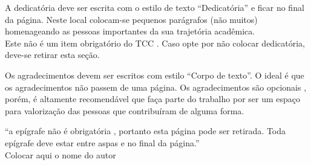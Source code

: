 \documentclass[
        oneside,      %
        english,			
        brazil			 
        ]{configcefetmglpd}
\begin{document}


\printacapa

\printafolhaderosto

\printacatalog  


\printafolhaaprov


 \begin{dedicatoria}
  		A dedicatória deve ser escrita com o estilo de texto “Dedicatória” e ficar no final da página. Neste local colocam-se pequenos parágrafos (não muitos) homenageando as pessoas importantes da sua trajetória acadêmica.\\  		
  		Este não é um item obrigatório do TCC \cite{bib:abnt14724}. Caso opte por não colocar dedicatória, deve-se retirar esta seção.
 \end{dedicatoria}

 
\begin{agradecimentos}
Os agradecimentos devem ser escritos com estilo “Corpo de texto”. O ideal é que os agradecimentos não passem de uma página. Os agradecimentos são opcionais \cite{bib:abnt14724}, porém, é altamente recomendável que faça parte do trabalho por ser um espaço para valorização das pessoas que contribuíram de alguma forma.
\end{agradecimentos}


\begin{epigrafemais}
	“a epígrafe não é obrigatória \cite{bib:abnt14724}, portanto esta página pode ser retirada. Toda epígrafe deve estar entre aspas e no final da página.”\\
	Colocar aqui o nome do autor
\end{epigrafemais}


\end{document}
